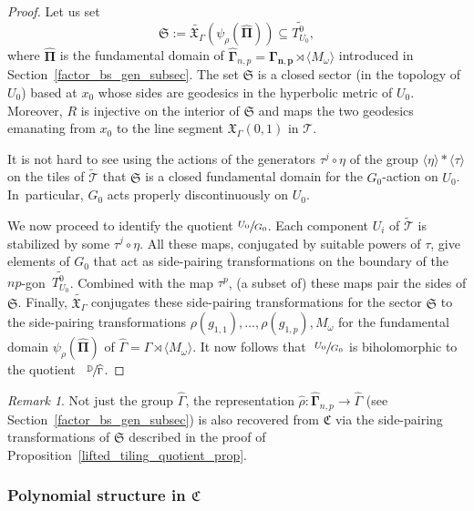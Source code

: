 \documentclass[JEP,XML,SOM,Unicode,NoFloatCountersInSection,published]{cedram}
\let\faktor\sfrac
\theoremstyle{definition}
\theoremstyle{remark}
\newtheorem{remark}[lemma]{Remark}
\newcommand{\D}{\mathbb{D}}
\newcommand{\cT}{\mathcal{T}}
\begin{document}
\begin{proof}
Let us set
\[
\mathfrak{S}:=\widetilde{\mathfrak{X}_\Gamma}(\psi_\rho(\widehat{\pmb{\Pi}}))\subseteq \widetilde{T^0_{U_0}},
\]
where $\widehat{\pmb{\Pi}}$ is the fundamental domain of $\widehat{\pmb{\Gamma}}_{n,p}=\pmb{\Gamma_{n,p}}\rtimes\langle M_\omega\rangle$ introduced in Section~\ref{factor_bs_gen_subsec}.
The set $\mathfrak{S}$ is a closed sector (in the topology of $U_0$) based at $x_0$ whose sides are geodesics in the hyperbolic metric of $U_0$. Moreover, $R$ is injective on the interior of $\mathfrak{S}$ and maps the two geodesics emanating from $x_0$ to the line segment $\mathfrak{X}_\Gamma(0,1)$ in $\cT$.

It is not hard to see using the actions of the generators $\tau^{j}\circ\eta$ of the group $\langle\eta\rangle\ast\langle\tau\rangle$ on the tiles of $\widetilde{\cT}$ that $\mathfrak{S}$ is a closed fundamental domain for the $G_0$-action on $U_0$. In~particular, $G_0$ acts properly discontinuously on $U_0$.

We now proceed to identify the quotient $\faktor{U_0}{G_0}$. Each component $U_i$ of $\widetilde{\cT}$ is stabilized by some $\tau^j\circ\eta$. All these maps, conjugated by suitable powers of $\tau$, give elements of $G_0$ that act as side-pairing transformations on the boundary of the $np$\nobreakdash-gon~$\widetilde{T^0_{U_0}}$. Combined with the map $\tau^p$, (a subset of) these maps pair the sides of $\mathfrak{S}$. Finally, $\widetilde{\mathfrak{X}_\Gamma}$ conjugates these side-pairing transformations for the sector $\mathfrak{S}$ to the side-pairing transformations $\rho(g_{1,1}),\dots,\rho(g_{1,p}), M_\omega$ for the fundamental domain $\psi_\rho(\widehat{\pmb{\Pi}})$ of $\widehat{\Gamma}=\Gamma\rtimes\langle M_\omega\rangle$.
It now follows that $\ \faktor{U_0}{G_0}$ is biholomorphic to the quotient~$\ \faktor{\D}{\widehat{\Gamma}}$.
\end{proof}

\begin{remark}
Not just the group $\widehat{\Gamma}$, the representation $\widehat{\rho}:\widehat{\pmb{\Gamma}}_{n,p}\to\widehat{\Gamma}$ (see Section~\ref{factor_bs_gen_subsec}) is also recovered from $\mathfrak{C}$ via the side-pairing transformations of $\mathfrak{S}$ described in the proof of Proposition~\ref{lifted_tiling_quotient_prop}.
\end{remark}

\subsubsection{Polynomial structure in $\mathfrak{C}$}\label{corr_poly_1_subsubsec}
\end{document}
